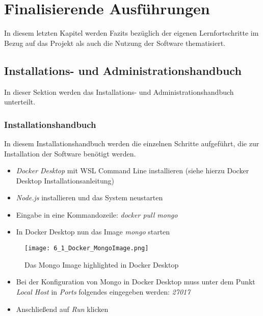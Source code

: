 \chapter{Finalisierende Ausführungen}

In diesem letzten Kapitel werden Fazits bezüglich der eigenen Lernfortschritte im Bezug auf das Projekt als auch die Nutzung der Software thematisiert.

\section{Installations- und Administrationshandbuch}

In dieser Sektion werden das Installations- und Administrationshandbuch unterteilt.

\subsection{Installationshandbuch}

In diesem Installationshandbuch werden die einzelnen Schritte aufgeführt, die zur Installation der Software benötigt werden.

\begin{itemize}
    \item   \textit{Docker Desktop} mit WSL Command Line installieren (siehe hierzu Docker Desktop Installationsanleitung)
    \item   \textit{Node.js} installieren und das System neustarten
    \item   Eingabe in eine Kommandozeile: \textit{docker pull mongo}
    \item   In Docker Desktop nun das Image \textit{mongo} starten
\end{itemize}

\begin{figure}[!h]
    \centering
    \texttt{[image: 6\_1\_Docker\_MongoImage.png]}
    \caption{Das Mongo Image highlighted in Docker Desktop}
    \label{fig:DockerMongoImage}
\end{figure}

\begin{itemize}
    \item   Bei der Konfiguration von Mongo in Docker Desktop muss unter dem Punkt \textit{Local Host} in \textit{Ports} folgendes eingegeben werden: \textit{27017}
    \item   Anschließend auf \textit{Run} klicken 
\end{itemize}


